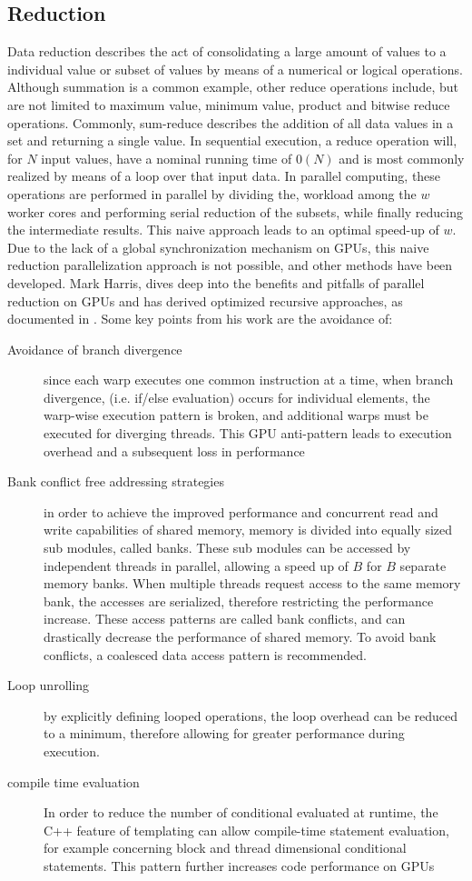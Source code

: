 \subsection{Reduction}
Data reduction describes the act of consolidating a large amount of values to
a individual value or subset of values by means of a numerical or logical operations.
Although summation is a common example, other reduce operations include,
but are not limited to maximum value, minimum value, product and bitwise reduce operations.
  Commonly,
sum-reduce describes the addition of all data values in a set and returning a single value.
In sequential execution, a reduce operation will, for $N$ input values, have a nominal
running time of $0(N)$ and is most commonly realized by means of a loop over that
input data.  In parallel computing, these operations are performed in parallel by dividing the,
workload among the $w$ worker cores and performing serial reduction of the subsets,
while finally reducing the intermediate results.  This naive approach leads to an
optimal \gls{speed-up} of $w$.  Due to the lack of a global synchronization mechanism
on \Glspl{GPU}, this naive reduction parallelization approach is not possible,
and other methods have been developed.  Mark Harris, dives deep into the benefits
and pitfalls of parallel reduction on \Glspl{GPU} and has derived optimized
recursive approaches, as documented in \cite{harris}.  Some key points from his work are
the avoidance of:
\begin{description}
  \item [Avoidance of branch divergence]
since each warp executes one common instruction at a time, when branch divergence,
(i.e. if/else evaluation) occurs for individual elements, the warp-wise execution pattern
is broken, and additional warps must be executed for diverging threads. This \Gls{GPU} anti-pattern
leads to execution overhead and a subsequent loss in performance
  \item [Bank conflict free addressing strategies]
  in order to achieve the improved performance and concurrent read and write capabilities
  of shared memory, memory is divided into equally sized sub modules, called banks.
  These sub modules can be accessed by independent threads in parallel, allowing a speed up
  of $B$ for $B$ separate memory banks.  When multiple threads request access to
  the same memory bank, the accesses are serialized, therefore restricting the performance increase.
  These access patterns are called bank conflicts, and can drastically decrease
  the performance of shared memory.  To avoid bank conflicts, a coalesced data
  access pattern is recommended.
  \item [Loop unrolling] by explicitly defining looped operations, the loop overhead
  can be reduced to a minimum, therefore allowing for greater performance during execution.
  \item [compile time evaluation]  In order to reduce the number of conditional
  evaluated at runtime, the C++ feature of templating can allow compile-time statement
  evaluation, for example concerning block and thread dimensional conditional statements.
  This pattern further increases code performance on \Glspl{GPU}
\end{description}

